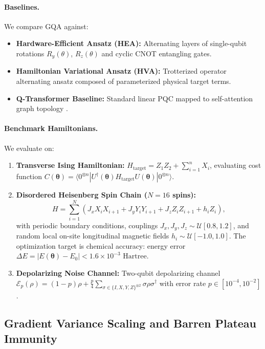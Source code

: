 \documentclass{article}
\begin{document}
\paragraph{Baselines.} We compare GQA against:
\begin{itemize}
    \item \textbf{Hardware-Efficient Ansatz (HEA):} Alternating layers of single-qubit rotations $R_y(\theta)$, $R_z(\theta)$ and cyclic CNOT entangling gates.
    \item \textbf{Hamiltonian Variational Ansatz (HVA):} Trotterized operator alternating ansatz composed of parameterized physical target terms.
    \item \textbf{Q-Transformer Baseline:} Standard linear PQC mapped to self-attention graph topology \citep{Li2022QuantumSelfattention}.
\end{itemize}

\paragraph{Benchmark Hamiltonians.}
We evaluate on:
\begin{enumerate}
    \item \textbf{Transverse Ising Hamiltonian:} $H_{\mathrm{target}} = Z_1 Z_2 + \sum_{i=1}^n X_i$, evaluating cost function $C(\boldsymbol{\theta}) = \langle 0^{\otimes n} | U^\dagger(\boldsymbol{\theta}) H_{\mathrm{target}} U(\boldsymbol{\theta}) | 0^{\otimes n} \rangle$.
    \item \textbf{Disordered Heisenberg Spin Chain ($N=16$ spins):}
    \begin{equation}
    H = \sum_{i=1}^N \left( J_x X_i X_{i+1} + J_y Y_i Y_{i+1} + J_z Z_i Z_{i+1} + h_i Z_i \right),
    \label{eq:heisenberg_hamiltonian}
    \end{equation}
    with periodic boundary conditions, couplings $J_x, J_y, J_z \sim \mathcal{U}[0.8, 1.2]$, and random local on-site longitudinal magnetic fields $h_i \sim \mathcal{U}[-1.0, 1.0]$. The optimization target is chemical accuracy: energy error $\Delta E = |E(\boldsymbol{\theta}) - E_0| < 1.6 \times 10^{-3}\text{ Hartree}$.
    \item \textbf{Depolarizing Noise Channel:} Two-qubit depolarizing channel $\mathcal{E}_p(\rho) = (1 - p)\rho + \frac{p}{4} \sum_{\sigma \in \{I, X, Y, Z\}^{\otimes 2}} \sigma \rho \sigma^\dagger$ with error rate $p \in [10^{-4}, 10^{-2}]$.
\end{enumerate}

\subsection{Gradient Variance Scaling and Barren Plateau Immunity}
\label{sec:gradient_scaling_results}
\end{document}
